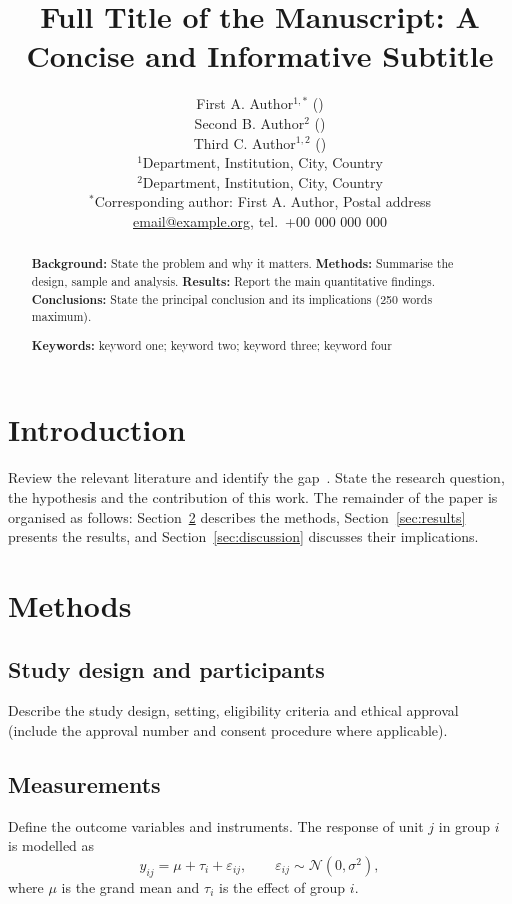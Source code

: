 \documentclass[12pt,a4paper]{article}
\title{{\headfont\bfseries\Large Full Title of the Manuscript: A Concise and Informative Subtitle}}
\author{%
  First A. Author$^{1,*}$ (\orcid{0000-0000-0000-0000}) \\
  Second B. Author$^{2}$ (\orcid{0000-0000-0000-0000}) \\
  Third C. Author$^{1,2}$ (\orcid{0000-0000-0000-0000}) \\[6pt]
  \small $^{1}$Department, Institution, City, Country \\
  $^{2}$Department, Institution, City, Country \\[3pt]
  $^{*}$Corresponding author: First A. Author, Postal address \\
  \href{mailto:email@example.org}{email@example.org}, tel.\ +00 000 000 000}
\date{}
\begin{document}
\singlespacing   %
\maketitle

\begin{abstract}
\singlespacing
\noindent\textbf{Background:} State the problem and why it matters.
\textbf{Methods:} Summarise the design, sample and analysis.
\textbf{Results:} Report the main quantitative findings.
\textbf{Conclusions:} State the principal conclusion and its implications
(250 words maximum).

\medskip
\noindent\textbf{Keywords:} keyword one; keyword two; keyword three; keyword four
\end{abstract}

\newpage
\doublespacing
\section{Introduction}\label{sec:intro}
Review the relevant literature and identify the gap~\cite{author2020,colleague2019}.
State the research question, the hypothesis and the contribution of this work.
The remainder of the paper is organised as follows: Section~\ref{sec:methods}
describes the methods, Section~\ref{sec:results} presents the results, and
Section~\ref{sec:discussion} discusses their implications.

\section{Methods}\label{sec:methods}
\subsection{Study design and participants}
Describe the study design, setting, eligibility criteria and ethical approval
(include the approval number and consent procedure where applicable).

\subsection{Measurements}
Define the outcome variables and instruments. The response of unit $j$ in
group $i$ is modelled as
\begin{equation}\label{eq:model}
  y_{ij} = \mu + \tau_i + \varepsilon_{ij}, \qquad
  \varepsilon_{ij} \sim \mathcal{N}(0,\sigma^2),
\end{equation}
where $\mu$ is the grand mean and $\tau_i$ is the effect of group $i$.
\end{document}
